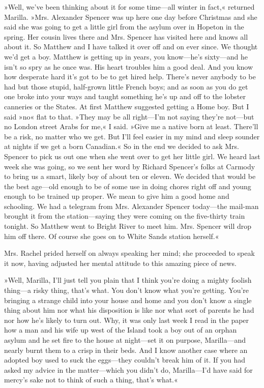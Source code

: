 »Well, we’ve been thinking about it for some time—all winter in fact,« returned Marilla. »Mrs. Alexander Spencer was up here one day before Christmas and she said she was going to get a little girl from the asylum over in Hopeton in the spring. Her cousin lives there and Mrs. Spencer has visited here and knows all about it. So Matthew and I have talked it over off and on ever since. We thought we’d get a boy. Matthew is getting up in years, you know—he’s sixty—and he isn’t so spry as he once was. His heart troubles him a good deal. And you know how desperate hard it’s got to be to get hired help. There’s never anybody to be had but those stupid, half-grown little French boys; and as soon as you do get one broke into your ways and taught something he’s up and off to the lobster canneries or the States. At first Matthew suggested getting a Home boy. But I said »no« flat to that. »They may be all right—I’m not saying they’re not—but no London street Arabs for me,« I said. »Give me a native born at least. There'll be a risk, no matter who we get. But I’ll feel easier in my mind and sleep sounder at nights if we get a born Canadian.« So in the end we decided to ask Mrs. Spencer to pick us out one when she went over to get her little girl. We heard last week she was going, so we sent her word by Richard Spencer’s folks at Carmody to bring us a smart, likely boy of about ten or eleven. We decided that would be the best age—old enough to be of some use in doing chores right off and young enough to be trained up proper. We mean to give him a good home and schooling. We had a telegram from Mrs. Alexander Spencer today—the mail-man brought it from the station—saying they were coming on the five-thirty train tonight. So Matthew went to Bright River to meet him. Mrs. Spencer will drop him off there. Of course she goes on to White Sands station herself.«

Mrs. Rachel prided herself on always speaking her mind; she proceeded to speak it now, having adjusted her mental attitude to this amazing piece of news.

»Well, Marilla, I’ll just tell you plain that I think you’re doing a mighty foolish thing—a risky thing, that’s what. You don’t know what you’re getting. You’re bringing a strange child into your house and home and you don’t know a single thing about him nor what his disposition is like nor what sort of parents he had nor how he’s likely to turn out. Why, it was only last week I read in the paper how a man and his wife up west of the Island took a boy out of an orphan asylum and he set fire to the house at night—set it on purpose, Marilla—and nearly burnt them to a crisp in their beds. And I know another case where an adopted boy used to suck the eggs—they couldn’t break him of it. If you had asked my advice in the matter—which you didn’t do, Marilla—I’d have said for mercy’s sake not to think of such a thing, that’s what.«

